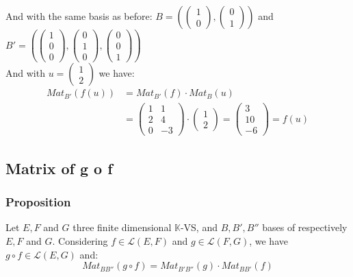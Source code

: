 \documentclass[notitlepage]{math}
\begin{document}
And with the same basis as before:
$B = (\begin{pmatrix} 1 \\ 0 \end{pmatrix}, \begin{pmatrix} 0 \\ 1 \end{pmatrix})$ and $B' = (\begin{pmatrix} 1 \\ 0 \\ 0 \end{pmatrix}, \begin{pmatrix} 0 \\ 1 \\ 0 \end{pmatrix}, \begin{pmatrix} 0 \\ 0 \\ 1 \end{pmatrix})$ \\

And with $u = \begin{pmatrix} 1 \\ 2 \end{pmatrix}$ we have:
\begin{align*}
    Mat_{B'}(f(u)) &= Mat_{B'}(f) \cdot Mat_{B}(u) \\
     &= \begin{pmatrix}
        1 & 1 \\
        2 & 4 \\
        0 & -3
    \end{pmatrix} \cdot \begin{pmatrix}
        1 \\
        2
    \end{pmatrix} 
    = \begin{pmatrix}
        3 \\
        10 \\
        -6
    \end{pmatrix} = f(u)
\end{align*}
\subsection{Matrix of g o f}
\subsubsection{Proposition}
Let $E,F$ and $G$ three finite dimensional $\mathbb{K}$-VS, and $B,B',B''$ bases of respectively $E,F$ and $G$. Considering $f \in \mathcal{L}(E,F)$ and $g \in \mathcal{L}(F,G)$, we have $g \circ  f \in \mathcal{L}(E,G)$ and:
\[ Mat_{BB''}(g \circ f) = Mat_{B'B''}(g) \cdot Mat_{BB'}(f)\]
\end{document}

